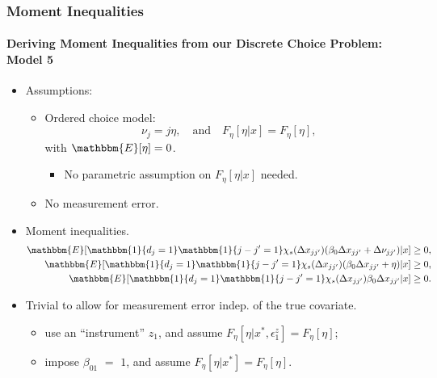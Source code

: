 \begin{frame}
\frametitle{Moment Inequalities}
\framesubtitle{Deriving Moment Inequalities from our Discrete Choice Problem: Model 5}

\begin{itemize}
	\item Assumptions:
	\begin{itemize}
		\item Ordered choice model:
		\begin{equation*}
		\nu_{j} = j\eta,\quad\text{and}\quad F_{\eta}[\eta|x]=F_{\eta}[\eta],
		\end{equation*}
		with $\mathbbm{E}[\eta]=0$.
		\begin{itemize}
			\item No parametric assumption on $F_{\eta}[\eta|x]$ needed.
		\end{itemize}
		\item No measurement error.
	\end{itemize}
	\item Moment inequalities.
	\begin{align*}
	\mathbbm{E}[\mathbbm{1}\{d_{j}=1\}\mathbbm{1}\{j-j'=1\}\chi_{s}(\Delta x_{jj'})(\beta_{0}\Delta x_{jj'}+\Delta\nu_{jj'})|x]\geq 0,\\
	\mathbbm{E}[\mathbbm{1}\{d_{j}=1\}\mathbbm{1}\{j-j'=1\}\chi_{s}(\Delta x_{jj'})(\beta_{0}\Delta x_{jj'}+\eta)|x]\geq 0,\\
	\mathbbm{E}[\mathbbm{1}\{d_{j}=1\}\mathbbm{1}\{j-j'=1\}\chi_{s}(\Delta x_{jj'})\beta_{0}\Delta x_{jj'}|x]\geq 0.
	\end{align*}
	\item Trivial to allow for measurement error indep. of the true covariate. 
	\begin{itemize}
		\item use an ``instrument'' $z_{1}$, and assume $F_{\eta}[\eta|x^{*},\epsilon^{z}_{1}]=F_{\eta}[\eta]$;
		\item impose $\beta_{01}$ $=$ $1$, and assume $F_{\eta}[\eta|x^{*}]=F_{\eta}[\eta]$.
	\end{itemize}
\end{itemize}
\end{frame}
